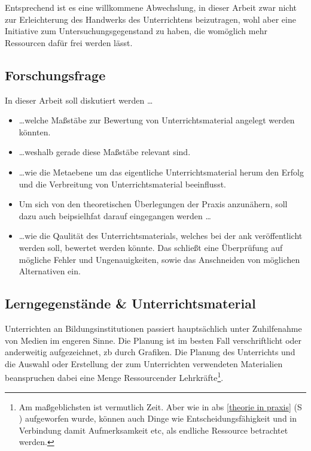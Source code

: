 

Entsprechend ist es eine willkommene Abwechslung, in dieser Arbeit zwar nicht zur Erleichterung des Handwerks des Unterrichtens beizutragen, wohl aber eine Initiative zum Untersuchungsgegenstand zu haben, die womöglich mehr Ressourcen dafür frei werden lässt. 



\subsection{Forschungsfrage}
In dieser Arbeit soll diskutiert werden \dots %
\begin{itemize}
    \item \dots welche Maßstäbe zur Bewertung von Unterrichtsmaterial angelegt werden könnten. 
    \item \dots weshalb gerade diese Maßstäbe relevant sind. 
    \item \dots wie die Metaebene um das eigentliche Unterrichtsmaterial herum den Erfolg und die Verbreitung von Unterrichtsmaterial beeinflusst.
    \item[] Um sich von den theoretischen Überlegungen der Praxis anzunähern, soll dazu auch beipsielhfat darauf eingegangen werden \dots
    \item \dots wie die Qaulität des Unterrichtsmaterials, welches bei der \acrlong{ank} veröffentlicht werden soll, bewertet werden könnte. Das schließt eine Überprüfung auf mögliche Fehler und Ungenauigkeiten, sowie das Anschneiden von möglichen Alternativen ein. 
\end{itemize}




\subsection{Lerngegenstände \& Unterrichtsmaterial}
Unterrichten an Bildungsinstitutionen passiert hauptsächlich unter Zuhilfenahme von Medien im engeren Sinne. Die Planung ist im besten Fall verschriftlicht oder anderweitig aufgezeichnet, \gls{zb} durch Grafiken. Die Planung des Unterrichts und die Auswahl oder Erstellung der zum Unterrichten verwendeten Materialien beanspruchen dabei eine Menge Ressourcender Lehrkräfte\footnote{
    Am maßgeblichsten ist vermutlich Zeit. Aber wie in \gls{abs} \ref{theorie in praxis} (\gls{S} \pageref{theorie in praxis}) aufgeworfen wurde, können auch Dinge wie Entscheidungsfähigkeit und in Verbindung damit Aufmerksamkeit \gls{etc}, als endliche Ressource betrachtet werden. 
}. %

